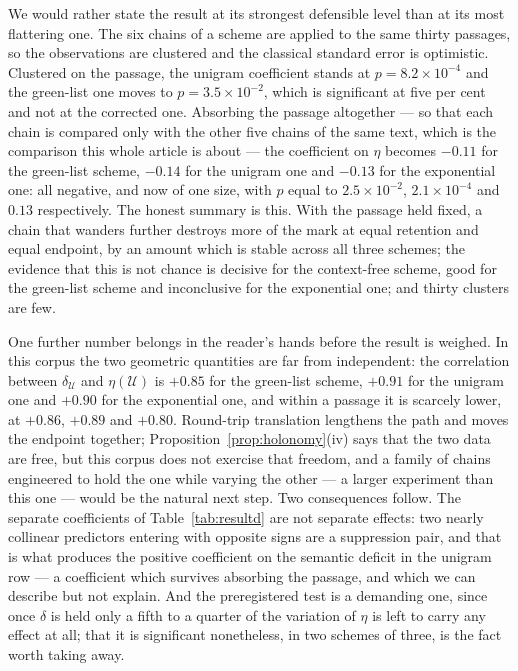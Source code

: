 \documentclass{article}
\theoremstyle{plain}
\theoremstyle{definition}
\numberwithin{equation}{section}
\newcommand{\Uc}{\mathcal{U}}
\begin{document}
We would rather state the result at its strongest defensible level than
at its most flattering one. The six chains of a scheme are applied to
the same thirty passages, so the observations are clustered and the
classical standard error is optimistic. Clustered on the passage, the
unigram coefficient stands at $p = 8.2\times10^{-4}$ and the green-list
one moves to $p = 3.5\times10^{-2}$, which is significant at five per
cent and not at the corrected one. Absorbing the passage altogether ---
so that each chain is compared only with the other five chains of the
same text, which is the comparison this whole article is about --- the
coefficient on $\eta$ becomes $-0.11$ for the green-list scheme,
$-0.14$ for the unigram one and $-0.13$ for the exponential one: all
negative, and now of one size, with $p$ equal to $2.5\times10^{-2}$,
$2.1\times10^{-4}$ and $0.13$ respectively. The honest summary is this. With the
passage held fixed, a chain that wanders further destroys more of the
mark at equal retention and equal endpoint, by an amount which is stable
across all three schemes; the evidence that this is not chance is
decisive for the context-free scheme, good for the green-list scheme and
inconclusive for the exponential one; and thirty clusters are few.

One further number belongs in the reader's hands before the result is
weighed. In this corpus the two geometric quantities are far from
independent: the correlation between $\delta_\Uc$ and $\eta(\Uc)$ is
$+0.85$ for the green-list scheme, $+0.91$ for the unigram one and
$+0.90$ for the exponential one, and within a passage it is scarcely
lower, at $+0.86$, $+0.89$ and $+0.80$. Round-trip translation
lengthens the path and moves the endpoint together;
Proposition~\ref{prop:holonomy}(iv) says that the two data are free, but
this corpus does not exercise that freedom, and a family of chains
engineered to hold the one while varying the other --- a larger
experiment than this one --- would be the natural next step. Two
consequences follow. The separate coefficients of
Table~\ref{tab:resultd} are not separate effects: two nearly collinear
predictors entering with opposite signs are a suppression pair, and that
is what produces the positive coefficient on the semantic deficit in the
unigram row --- a coefficient which survives absorbing the passage, and
which we can describe but not explain. And the preregistered test is a
demanding one, since once $\delta$ is held only a fifth to a quarter of
the variation of $\eta$ is left to carry any effect at all; that it is
significant nonetheless, in two schemes of three, is the fact worth
taking away.
\end{document}
